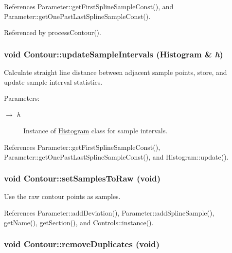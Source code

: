 References Parameter::getFirstSplineSampleConst(), and Parameter::getOnePastLastSplineSampleConst().

Referenced by processContour().\hypertarget{classContour_08ac24e5771e503f0f79803e54439c75}{
\subsubsection[updateSampleIntervals]{\setlength{\rightskip}{0pt plus 5cm}void Contour::updateSampleIntervals ({\bf Histogram} \& {\em h})}}
\label{classContour_08ac24e5771e503f0f79803e54439c75}


Calculate straight line distance between adjacent sample points, store, and update sample interval statistics. \begin{Desc}
\item[Parameters:]
\begin{description}
\item[\mbox{$\rightarrow$} {\em h}]Instance of \hyperlink{classHistogram}{Histogram} class for sample intervals. \end{description}
\end{Desc}


References Parameter::getFirstSplineSampleConst(), Parameter::getOnePastLastSplineSampleConst(), and Histogram::update().\hypertarget{classContour_f2218507768d03029d77e076ba793fd5}{
\subsubsection[setSamplesToRaw]{\setlength{\rightskip}{0pt plus 5cm}void Contour::setSamplesToRaw (void)}}
\label{classContour_f2218507768d03029d77e076ba793fd5}


Use the raw contour points as samples. 

References Parameter::addDeviation(), Parameter::addSplineSample(), getName(), getSection(), and Controls::instance().\hypertarget{classContour_0b7d66074d566108b50fd23e370e3503}{
\subsubsection[removeDuplicates]{\setlength{\rightskip}{0pt plus 5cm}void Contour::removeDuplicates (void)}}
\label{classContour_0b7d66074d566108b50fd23e370e3503}


